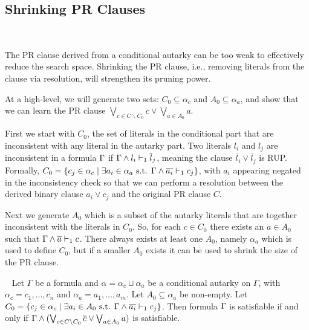 \subsection{Shrinking PR Clauses}~\label{subsec:shrinking}

The PR clause derived from a conditional autarky can be too weak to effectively
reduce the search space.
Shrinking the PR clause, i.e., removing literals from the clause via
resolution, will strengthen its pruning power. 

At a high-level, we will generate two sets: $C_0 \subseteq \alpha_c$ and $A_0
\subseteq \alpha_a$, and show that we can learn the PR clause $\bigvee_{c \in C
\backslash C_0} \overline{c} \lor \bigvee_{a \in A_0} a$. 

First we start with $C_0$, the set of literals in the conditional part that are
inconsistent with any literal in the autarky part. Two literals $l_i$ and $l_j$
are inconsistent in a formula $\Gamma$ if
$\Gamma \land l_i \vdash_1 \overline{l}_j$, meaning the clause
$\overline{l}_i \lor \overline{l}_j$ is RUP. Formally, $C_0 = \{c_j \in \alpha_c
\mid \exists a_i \in \alpha_a \text{ s.t. }
\Gamma \land \overline{a_i} \vdash_1 c_j \}$, with $a_i$ appearing negated
in the inconsistency check so that we can perform a resolution between the
derived binary clause  $a_i \lor c_j$ and the original PR clause $C$.

Next we generate $A_0$ which is a subset of the autarky literals that are
together inconsistent with the literals in $C_0$. So, for each $c \in C_0$ there
exists an $a \in A_0$ such that $\Gamma \land \overline{a} \vdash_1 c$. There always
exists at least one $A_0$, namely $\alpha_a$ which is used to define $C_0$, but
if a smaller $A_0$ exists it can be used to shrink the size of the PR clause. 


\begin{theorem}~\label{thm:shrunkgbcequisat} Let $\Gamma$ be a formula and
    $\alpha = \alpha_c \sqcup \alpha_a$ be a conditional autarky on $\Gamma$,
    with $\alpha_c = c_1, \dots, c_n$ and $\alpha_a = a_1, \dots, a_m$.
    Let $A_0 \subseteq \alpha_a$ be non-empty.
    Let $C_0 = \{c_j \in \alpha_c
\mid \exists a_i \in A_0 \text{ s.t. }
\Gamma \land \overline{a_i} \vdash_1 c_j \}$.
    Then formula $\Gamma$ is satisfiable if and only if
    $\Gamma \land (\bigvee_{c \in C \backslash C_0} \overline{c} \lor
    \bigvee_{a \in A_0} a)$ is satisfiable.
\end{theorem}

